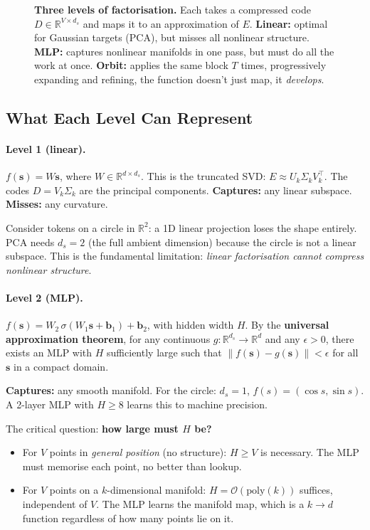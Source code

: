 \documentclass[11pt, a4paper]{article}
\newcommand{\R}{\mathbb{R}}
\newcommand{\calO}{\mathcal{O}}
\theoremstyle{remark}
\begin{document}
\begin{figure}[h]
\begin{tikzpicture}[>=Stealth, font=\small, scale=0.9]
\end{tikzpicture}
\caption{\textbf{Three levels of factorisation.}
Each takes a compressed code $D \in \R^{V \times d_s}$ and maps it to an approximation of $E$.
\textbf{Linear:} optimal for Gaussian targets (PCA), but misses all nonlinear structure.
\textbf{MLP:} captures nonlinear manifolds in one pass, but must do all the work at once.
\textbf{Orbit:} applies the same block $T$ times, progressively expanding and refining, the
function doesn't just map, it \emph{develops}.}
\label{fig:factorisation-levels}
\end{figure}


\subsection{What Each Level Can Represent}

\paragraph{Level 1 (linear).}
$f(\mathbf{s}) = W\mathbf{s}$, where $W \in \R^{d \times d_s}$.
This is the truncated SVD: $E \approx U_k \Sigma_k V_k^\top$.
The codes $D = V_k \Sigma_k$ are the principal components.
\textbf{Captures:} any linear subspace. \textbf{Misses:} any curvature.

Consider tokens on a circle in $\R^2$: a 1D linear projection loses the shape entirely.
PCA needs $d_s = 2$ (the full ambient dimension) because the circle is not a linear subspace.
This is the fundamental limitation: \emph{linear factorisation cannot compress nonlinear structure}.

\paragraph{Level 2 (MLP).}
$f(\mathbf{s}) = W_2 \, \sigma(W_1 \mathbf{s} + \mathbf{b}_1) + \mathbf{b}_2$,
with hidden width $H$.
By the \textbf{universal approximation theorem}, for any continuous $g: \R^{d_s} \to \R^d$
and any $\epsilon > 0$, there exists an MLP with $H$ sufficiently large such that
$\|f(\mathbf{s}) - g(\mathbf{s})\| < \epsilon$ for all $\mathbf{s}$ in a compact domain.

\textbf{Captures:} any smooth manifold. For the circle: $d_s = 1$, $f(s) = (\cos s, \sin s)$.
A 2-layer MLP with $H \geq 8$ learns this to machine precision.

The critical question: \textbf{how large must $H$ be?}
\begin{itemize}[nosep]
    \item For $V$ points in \emph{general position} (no structure): $H \geq V$ is necessary.
          The MLP must memorise each point, no better than lookup.
    \item For $V$ points on a $k$-dimensional manifold: $H = \calO(\text{poly}(k))$ suffices,
          independent of $V$.
          The MLP learns the manifold map, which is a $k \to d$ function regardless of how many
          points lie on it.
\end{itemize}
\end{document}
